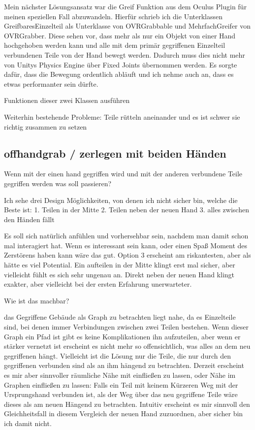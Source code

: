 \documentclass[11pt]{article} %
\begin{document}
Mein nächster Lösungsansatz war die Greif Funktion aus dem Oculus Plugin für meinen speziellen Fall abzuwandeln. Hierfür schrieb ich die Unterklassen GreifbaresEinzelteil als Unterklasse von OVRGrabbable und MehrfachGreifer von OVRGrabber.
Diese sehen vor, dass mehr als nur ein Objekt von einer Hand hochgehoben werden kann und alle mit dem primär gegriffenen Einzelteil verbundenen Teile von der Hand bewegt werden. Dadurch muss dies nicht mehr von Unitys Physics Engine über Fixed Joints übernommen werden.
Es sorgte dafür, dass die Bewegung ordentlich abläuft und ich nehme auch an, dass es etwas performanter sein dürfte.


Funktionen dieser zwei Klassen ausführen

Weiterhin bestehende Probleme: 
Teile rütteln aneinander und 
es ist schwer sie richtig zusammen zu setzen

\subsection{offhandgrab / zerlegen mit beiden Händen}

Wenn mit der einen hand gegriffen wird und mit der anderen verbundene Teile gegriffen werden was soll passieren?

Ich sehe drei Design Möglichkeiten, von denen ich nicht sicher bin, welche die Beste ist:
1. Teilen in der Mitte
2. Teilen neben der neuen Hand
3. alles zwischen den Händen fällt

Es soll sich natürlich anfühlen und vorhersehbar sein, nachdem man damit schon mal interagiert hat.
Wenn es interessant sein kann, oder einen Spaß Moment des Zerstörens haben kann wäre das gut.
Option 3 erscheint am riskantesten, aber als hätte es viel Potential. 
Ein aufteilen in der Mitte klingt erst mal sicher, aber vielleicht fühlt es sich sehr ungenau an.
Direkt neben der neuen Hand klingt exakter, aber vielleicht bei der ersten Erfahrung unerwarteter.

Wie ist das machbar?

das Gegriffene Gebäude als Graph zu betrachten liegt nahe, da es Einzelteile sind, bei denen immer Verbindungen zwischen zwei Teilen bestehen.
Wenn dieser Graph ein Pfad ist gibt es keine Komplikationen ihn aufzuteilen, aber wenn er stärker vernetzt ist erscheint es nicht mehr so offensichtlich, was alles an dem neu gegriffenen hängt.
Vielleicht ist die Lösung nur die Teile, die nur durch den gegriffenen verbunden sind als an ihm hängend zu betrachten.
Derzeit erscheint es mir aber sinnvoller räumliche Nähe mit einfließen zu lassen, oder Nähe im Graphen einfließen zu lassen: Falls ein Teil mit keinem Kürzeren Weg mit der Ursprungshand verbunden ist, als der Weg über das neu gegriffene Teile wäre dieses als am neuen Hängend zu betrachten.
Intuitiv erscheint es mir sinnvoll den Gleichheitsfall in diesem Vergleich der neuen Hand zuzuordnen, aber sicher bin ich damit nicht.
\end{document}

